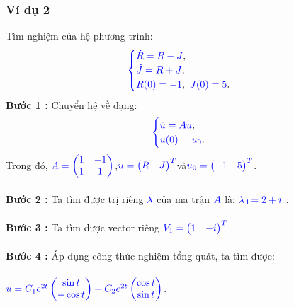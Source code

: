 \documentclass[a4paper]{article}
\begin{document}
\subsubsection{Ví dụ 2}
Tìm nghiệm của hệ phương trình:
\begin{align}
	    \textcolor{blue}{
	    \begin{cases}
            \dot R = R - J \textcolor{black}{,}\\
            \dot J = R + J \textcolor{black}{,}\\
            R(0) = -1\textcolor{black}{,} \enskip J(0) = 5 \textcolor{black}{.}
        \end{cases}
        }
        \notag
	\end{align}
{\bfseries Bước 1 :} Chuyển hệ về dạng:
\begin{align}
	    \textcolor{blue}{
	    \begin{cases}
            \dot u = Au \textcolor{black}{,}\\
            u(0) = u\sb{0}\textcolor{black}{.}
        \end{cases}
        }
        \notag
	\end{align}
Trong đó,  $\textcolor{blue}{A = \begin{pmatrix} 1 & -1\\ 1 & 1 \end{pmatrix}}$,\enskip $\textcolor{blue}{u = \begin{pmatrix} R & J \end{pmatrix}\sp{T}}$\enskip và\enskip $\textcolor{blue}{u\sb{0} = \begin{pmatrix} -1 & 5 \end{pmatrix}\sp{T}}$.\\\\
{\bfseries Bước 2 :} Ta tìm được trị riêng $\textcolor{blue}{\lambda}$ của ma trận $\textcolor{blue}{A}$ là: $\textcolor{blue}{\lambda}$$\textcolor{blue}{\sb{1}}$$\textcolor{blue}{=2+i}$ .\\\\
{\bfseries Bước 3 :} Ta tìm được vector riêng \enskip $\textcolor{blue}{V\sb{1} = \begin{pmatrix} 1 & -i \end{pmatrix}\sp{T}}$\enskip\\\\
{\bfseries Bước 4 :} Áp dụng công thức nghiệm tổng quát, ta tìm được:\\\\
$\textcolor{blue}{u = C\sb{1} e\sp{2t}\begin{pmatrix} \sin{t} \\ -\cos{t} \end{pmatrix} + C\sb{2} e\sp{2t}\begin{pmatrix} \cos{t} \\ \sin{t} \end{pmatrix}}$.\\\\
\end{document}
